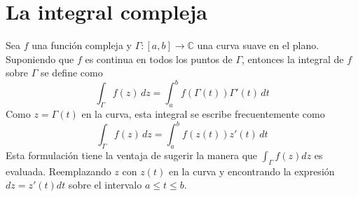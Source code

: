 \section{La integral compleja}

\begin{definition}
Sea $f$ una función compleja y $\Gamma:[a,b]\to\mathbb{C}$ una curva suave en el plano. Suponiendo que $f$ es continua en todos los puntos de $\Gamma$, entonces la integral de $f$ sobre $\Gamma$ se define como
$$
\int_\Gamma f(z)\,dz = \int_a^b f(\Gamma(t))\Gamma'(t)\,dt
$$
Como $z=\Gamma(t)$ en la curva, esta integral se escribe frecuentemente como
$$
\int_\Gamma f(z)\,dz = \int_a^b f(z(t))z'(t)\,dt
$$
Esta formulación tiene la ventaja de sugerir la manera que $\int_\Gamma f(z)dz$ es evaluada. Reemplazando $z$ con $z(t)$ en la curva y encontrando la expresión $dz=z'(t)dt$ sobre el intervalo $a\leqslant t\leqslant b$. 
\end{definition}
